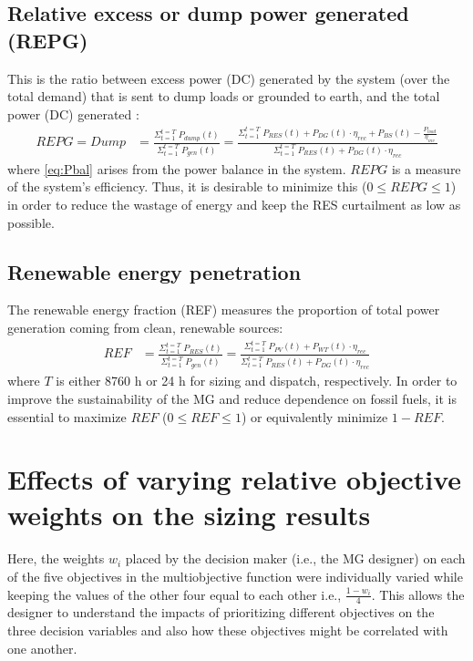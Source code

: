 \documentclass[final,3p,times]{elsarticle}
\begin{document}
\subsection{Relative excess or dump power generated (REPG)}

This is the ratio between excess power (DC) generated by the system (over the total demand) that is sent to dump loads or grounded to earth, and the total power (DC) generated \cite{kaabeche2011b}:
\begin{align}
    REPG = Dump & = \frac{\Sigma_{t=1}^{t=T} \; P_{dump}(t)}{\Sigma_{t=1}^{t=T} \; P_{gen}(t)} = \frac{\Sigma_{t=1}^{t=T} \; P_{RES}(t) + P_{DG}(t) \cdot \eta_{rec} + P_{BS}(t) - \frac{P_{load}}{\eta_{inv}}}{\Sigma_{t=1}^{t=T} \; P_{RES}(t) + P_{DG}(t) \cdot \eta_{rec}} \label{eq:Pbal}
\end{align}
where \cref{eq:Pbal} arises from the power balance in the system. $REPG$ is a measure of the system's efficiency. Thus, it is desirable to minimize this ($0 \leq REPG \leq 1$) in order to reduce the wastage of energy and keep the RES curtailment as low as possible. 

\subsection{Renewable energy penetration}
The renewable energy fraction (REF) measures the proportion of total power generation coming from clean, renewable sources:
\begin{align}
    REF & = \frac{\Sigma_{t=1}^{t=T} \; P_{RES}(t)}{\Sigma_{t=1}^{t=T} \; P_{gen}(t)} = \frac{\Sigma_{t=1}^{t=T} \; P_{PV}(t) + P_{WT}(t) \cdot \eta_{rec}}{\Sigma_{t=1}^{t=T} \; P_{RES}(t) + P_{DG}(t) \cdot \eta_{rec}}
\end{align}
where $T$ is either 8760 h or 24 h for sizing and dispatch, respectively. In order to improve the sustainability of the MG and reduce dependence on fossil fuels, it is essential to maximize $REF$ ($0 \leq REF \leq 1$) or equivalently minimize $1-REF$. 

\section{Effects of varying relative objective weights on the sizing results \label{app:weights}}

Here, the weights $w_i$ placed by the decision maker (i.e., the MG designer) on each of the five objectives in the multiobjective function were individually varied while keeping the values of the other four equal to each other i.e., $\frac{1-w_i}{4}$. This allows the designer to understand the impacts of prioritizing different objectives on the three decision variables and also how these objectives might be correlated with one another. 
\end{document}

